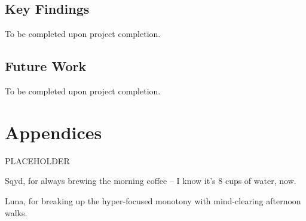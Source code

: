 \documentclass[sigconf]{acmart}
\begin{document}
\subsection{Key Findings}
To be completed upon project completion.
\subsection{Future Work}
To be completed upon project completion.

\section{Appendices}
PLACEHOLDER


\begin{acks}
 \hspace{3mm} Sqyd, for always brewing the morning coffee -- I know it's 8 cups of water, now.

Luna, for breaking up the hyper-focused monotony with mind-clearing afternoon walks.
\end{acks}





\appendix
\end{document}
